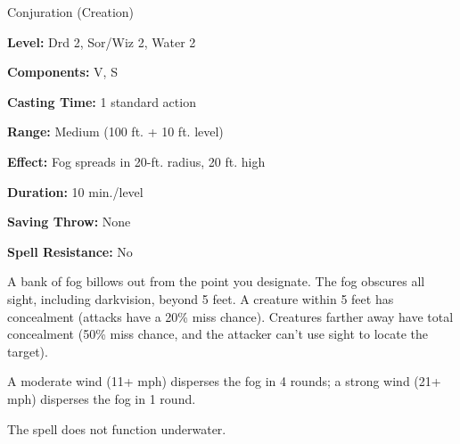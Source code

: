
Conjuration (Creation)

\textbf{Level:} Drd 2, Sor/Wiz 2, Water 2

\textbf{Components:} V, S

\textbf{Casting Time:} 1 standard action

\textbf{Range:} Medium (100 ft. + 10 ft. level)

\textbf{Effect:} Fog spreads in 20-ft. radius, 20 ft. high

\textbf{Duration:} 10 min./level

\textbf{Saving Throw:} None

\textbf{Spell Resistance:} No

A bank of fog billows out from the point you designate. The fog obscures all sight, 
including darkvision, beyond 5 feet. A creature within 5 feet has concealment (attacks 
have a 20\% miss chance). Creatures farther away have total concealment (50\% miss 
chance, and the attacker can't use sight to locate the target).

A moderate wind (11+ mph) disperses the fog in 4 rounds; a strong wind (21+ mph) 
disperses the fog in 1 round.

The spell does not function underwater.

